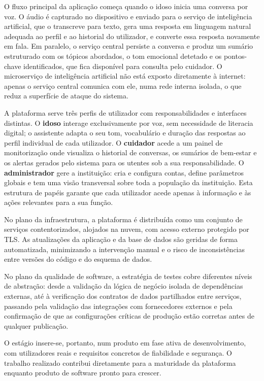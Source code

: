 O fluxo principal da aplicação começa quando o idoso inicia uma conversa por voz. O áudio é
capturado no dispositivo e enviado para o serviço de inteligência artificial, que o transcreve
para texto, gera uma resposta em linguagem natural adequada ao perfil e ao historial do
utilizador, e converte essa resposta novamente em fala. Em paralelo, o serviço central persiste
a conversa e produz um sumário estruturado com os tópicos abordados, o tom emocional
detetado e os pontos-chave identificados, que fica disponível para consulta pelo cuidador.
O microserviço de inteligência artificial não está exposto diretamente à internet: apenas o
serviço central comunica com ele, numa rede interna isolada, o que reduz a superfície de
ataque do sistema.

A plataforma serve três perfis de utilizador com responsabilidades e interfaces distintas.
O \textbf{idoso} interage exclusivamente por voz, sem necessidade de literacia digital; o
assistente adapta o seu tom, vocabulário e duração das respostas ao perfil individual de cada
utilizador. O \textbf{cuidador} acede a um painel de monitorização onde visualiza o historial
de conversas, os sumários de bem-estar e os alertas gerados pelo sistema para os utentes sob
a sua responsabilidade. O \textbf{administrador} gere a instituição: cria e configura contas,
define parâmetros globais e tem uma visão transversal sobre toda a população da instituição.
Esta estrutura de papéis garante que cada utilizador acede apenas à informação e às ações
relevantes para a sua função.

No plano da infraestrutura, a plataforma é distribuída como um conjunto de serviços
contentorizados, alojados na nuvem, com acesso externo protegido por TLS. As atualizações
da aplicação e da base de dados são geridas de forma automatizada, minimizando a intervenção
manual e o risco de inconsistências entre versões do código e do esquema de dados.

No plano da qualidade de software, a estratégia de testes cobre diferentes níveis de
abstração: desde a validação da lógica de negócio isolada de dependências externas, até à
verificação dos contratos de dados partilhados entre serviços, passando pela validação das
integrações com fornecedores externos e pela confirmação de que as configurações críticas de
produção estão corretas antes de qualquer publicação.

O estágio insere-se, portanto, num produto em fase ativa de desenvolvimento, com utilizadores
reais e requisitos concretos de fiabilidade e segurança. O trabalho realizado contribui
diretamente para a maturidade da plataforma enquanto produto de software pronto para crescer.

